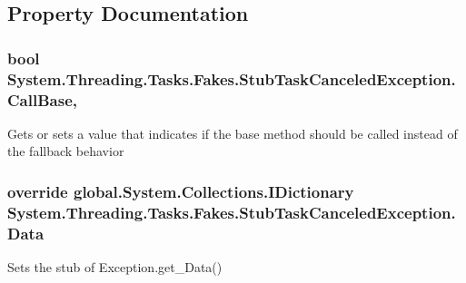 \subsection{Property Documentation}
\hypertarget{class_system_1_1_threading_1_1_tasks_1_1_fakes_1_1_stub_task_canceled_exception_a485a0bf981bfc5e260a3683c7ad02612}{
\subsubsection[{Call\-Base}]{\setlength{\rightskip}{0pt plus 5cm}bool System.\-Threading.\-Tasks.\-Fakes.\-Stub\-Task\-Canceled\-Exception.\-Call\-Base\hspace{0.3cm}{\ttfamily [get]}, {\ttfamily [set]}}}\label{class_system_1_1_threading_1_1_tasks_1_1_fakes_1_1_stub_task_canceled_exception_a485a0bf981bfc5e260a3683c7ad02612}


Gets or sets a value that indicates if the base method should be called instead of the fallback behavior

\hypertarget{class_system_1_1_threading_1_1_tasks_1_1_fakes_1_1_stub_task_canceled_exception_a7df968f0170ced42047ad52de9fce545}{
\subsubsection[{Data}]{\setlength{\rightskip}{0pt plus 5cm}override global.\-System.\-Collections.\-I\-Dictionary System.\-Threading.\-Tasks.\-Fakes.\-Stub\-Task\-Canceled\-Exception.\-Data\hspace{0.3cm}{\ttfamily [get]}}}\label{class_system_1_1_threading_1_1_tasks_1_1_fakes_1_1_stub_task_canceled_exception_a7df968f0170ced42047ad52de9fce545}


Sets the stub of Exception.\-get\-\_\-\-Data()

